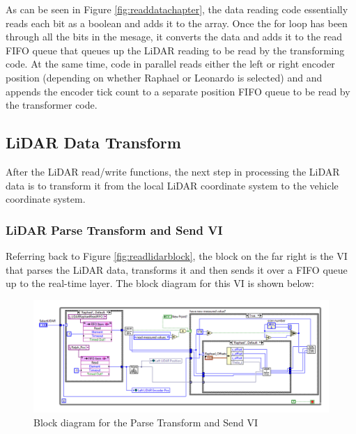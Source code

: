\newpage

\noindent As can be seen in Figure \ref{fig:readdatachapter}, the data reading code essentially reads each bit as a boolean and adds it to the array. Once the for loop has been through all the bits in the mesage, it converts the data and adds it to the read FIFO queue that queues up the LiDAR reading to be read by the transforming code. At the same time, code in parallel reads either the left or right encoder position (depending on whether Raphael or Leonardo is selected) and and appends the encoder tick count to a separate position FIFO queue to be read by the transformer code.

\subsection{LiDAR Data Transform}
After the LiDAR read/write functions, the next step in processing the LiDAR data is to transform it from the local LiDAR coordinate system to the vehicle coordinate system. 

\subsubsection{LiDAR Parse Transform and Send VI}
Referring back to Figure \ref{fig:readlidarblock}, the block on the far right is the VI that parses the LiDAR data, transforms it and then sends it over a FIFO queue up to the real-time layer. The block diagram for this VI is shown below:

\begin{figure}[h!]
\centering
\includegraphics[scale=0.5]{Photos/lidartransformandsend.png}
\caption{Block diagram for the Parse Transform and Send VI}
\label{fig:parseandsend}
\end{figure}

